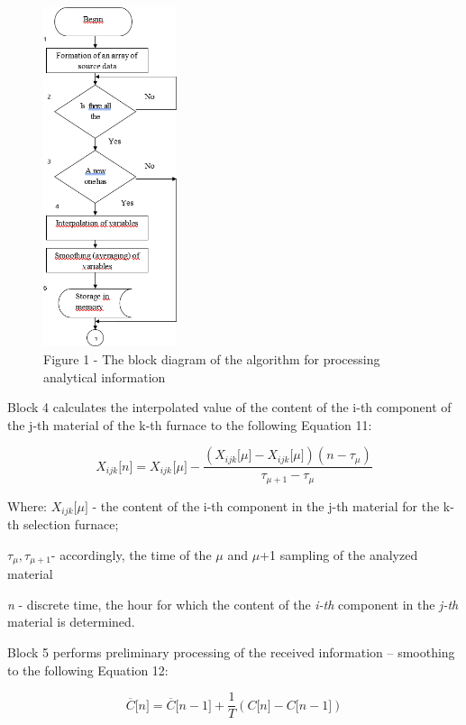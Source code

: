 \begin{figure}[H]
	\centering
	\includegraphics[width=0.35\textwidth]{assets/7}
	\caption*{Figure 1 - The block diagram of the algorithm for processing analytical information}
\end{figure}

Block 4 calculates the interpolated value of the content of the i-th
component of the j-th material of the k-th furnace to the following
Equation 11:

\begin{equation}
Χ_{ijk}\lbrack n\rbrack = Χ_{ijk_{}}\lbrack\mu\rbrack - \frac{\left( Χ_{ijk}\lbrack\mu\rbrack - Χ_{ijk}\lbrack\mu\rbrack \right)\left( n - \tau_{\mu} \right)}{\tau_{\mu + 1} - \tau_{\mu}}
\end{equation}

Where: \(X_{ijk}\lbrack\mu\rbrack\) - the content of the i-th component
in the j-th material for the k-th selection furnace;

\(\tau_{\mu},\tau_{\mu + 1}\)- accordingly, the time of the
$\mu$ and
$\mu$+1 sampling of the analyzed material

\emph{n} - discrete time, the hour for which the content of the
\emph{i-th} component in the \emph{j-th} material is determined.

Block 5 performs preliminary processing of the received information --
smoothing to the following Equation 12:

\begin{equation}
\overline{C}\lbrack n\rbrack = \overline{C}\lbrack n - 1\rbrack + \frac{1}{T}\left( C\lbrack n\rbrack - C\lbrack n - 1\rbrack \right)
\end{equation}

